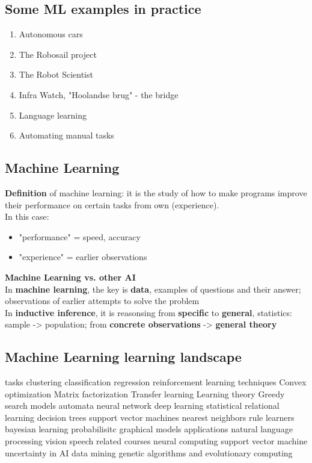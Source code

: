\subsection{Some ML examples in practice}
\begin{enumerate}
    \item Autonomous cars
    \item The Robosail project
    \item The Robot Scientist
    \item Infra Watch, "Hoolandse brug" - the bridge
    \item Language learning
    \item Automating manual tasks
\end{enumerate}

\subsection{Machine Learning}
\textbf{Definition} of machine learning: it is the study of how to make programs improve their performance on certain tasks from own (experience).
\\In this case:
\begin{itemize}
    \item "performance" = speed, accuracy
    \item "experience" = earlier observations
\end{itemize}
\textbf{Machine Learning vs. other AI} \\
In \textbf{machine learning}, the key is \textbf{data}, examples of questions and their answer; observations of earlier attempts to solve the problem
\\ In \textbf{inductive inference}, it is reasonsing from \textbf{specific} to \textbf{general}, statistics: sample -> population; from \textbf{concrete observations} -> \textbf{general theory}

\subsection{Machine Learning learning landscape}
\begin{outline}
    \1 tasks
        \2 clustering
        \2 classification
        \2 regression
        \2 reinforcement learning
    \1 techniques
        \2 Convex optimization
        \2 Matrix factorization
        \2 Transfer learning
        \2 Learning theory
        \2 Greedy search
    \1 models
        \2 automata
        \2 neural network
        \2 deep learning
        \2 statistical relational learning
        \2 decision trees
        \2 support vector machines
        \2 nearest neighbors
        \2 rule learners
        \2 bayesian learning
        \2 probabilisitc graphical models
    \1 applications
        \2 natural language processing
        \2 vision
        \2 speech
    \1 related courses
        \2 neural computing
        \2 support vector machine
        \2 uncertainty in AI
        \2 data mining
        \2 genetic algorithms and evolutionary computing
\end{outline}

